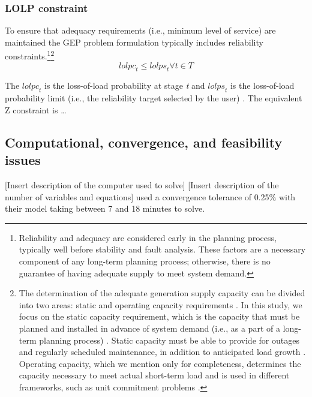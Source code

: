 \documentclass[10pt]{amsart}
\begin{document}
\subsubsection{LOLP constraint \nopunct}
To ensure that adequacy requirements (i.e., minimum level of service) are maintained the GEP problem formulation typically includes reliability constraints.\footnote{Reliability and adequacy are considered early in the planning process, typically well before stability and fault analysis. These factors are a necessary component of any long-term planning process; otherwise, there is no guarantee of having adequate supply to meet system demand.}\footnote{The determination of the adequate generation supply capacity can be divided into two areas: static and operating capacity requirements \parencite{billinton1984reliability}.
In this study, we focus on the static capacity requirement, which is the capacity that must be planned and installed in advance of system demand (i.e., as a part of a long-term planning process) \parencite{billinton1984reliability}.
Static capacity must be able to provide for outages and regularly scheduled maintenance, in addition to anticipated load growth \parencite{billinton1984reliability}.
Operating capacity, which we mention only for completeness, determines the capacity necessary to meet actual short-term load and is used in different frameworks, such as unit commitment problems \parencite{billinton1984reliability}.}
\begin{equation}
\textit{lolpc}_{t} \leq \textit{lolps}_{t} \forall t \in T 
\end{equation}

The $\textit{lolpc}_{t}$ is the loss-of-load probability at stage \textit{t} and $\textit{lolps}_{t}$ is the loss-of-load probability limit (i.e., the reliability target selected by the user) \parencite{dragoon:2006aa}. 
The equivalent Z constraint is \ldots
\subsection{Computational, convergence, and feasibility issues}
[Insert description of the computer used to solve]
[Insert description of the number of variables and equations]
\cite{bakirtzis} used a convergence tolerance of 0.25\% with their model taking between 7 and 18 minutes to solve. 
\end{document}

